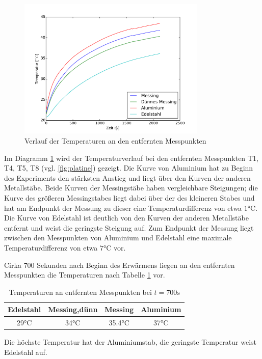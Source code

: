 \begin{figure}[p]
	\label{fig:entftemp}
	\centering
	\includegraphics[width=0.8\textwidth]{Bilder/M1_Tempverl.pdf}
	\caption{Verlauf der Temperaturen an den entfernten Messpunkten}
\end{figure}
Im Diagramm \ref{fig:entftemp} wird der Temperaturverlauf bei den entfernten Messpunkten T1, T4, T5, T8 (vgl. \ref{fig:platine}) gezeigt. 
Die Kurve von Aluminium hat zu Beginn des Experiments den stärksten Anstieg und liegt über den Kurven der anderen Metallstäbe. 
Beide Kurven der Messingstäbe haben vergleichbare Steigungen;
die Kurve des größeren Messingstabes liegt dabei über der des kleineren Stabes und hat am Endpunkt der Messung zu dieser eine Temperaturdifferenz von etwa $1 \si{\degreeCelsius}$. 
Die Kurve von Edelstahl ist deutlich von den Kurven der anderen Metallstäbe entfernt und weist die geringste Steigung auf. 
Zum Endpunkt der Messung liegt zwischen den Messpunkten von Aluminium und Edelstahl eine maximale Temperaturdifferenz von etwa $7 \si{\degreeCelsius}$ vor. 

Cirka 700 Sekunden nach Beginn des Erwärmens liegen an den entfernten Messpunkten die Temperaturen nach Tabelle \ref{tab:700} vor. 
\begin{table}[h!]
	\centering
	\begin{tabular}{cccc}
	\toprule
	{Edelstahl}&{Messing,dünn}&{Messing}&{Aluminium}\\
	\midrule
	29$\si{\degreeCelsius}$& 34$\si{\degreeCelsius}$& 35.4$\si{\degreeCelsius}$& 37$\si{\degreeCelsius}$\\
	\bottomrule
	\end{tabular}
	\label{tab:700}
	\caption{Temperaturen an entfernten Messpunkten bei $t=700\si{\second}$}
\end{table}
Die höchste Temperatur hat der Aluminiumstab, die geringste Temperatur weist Edelstahl auf.

